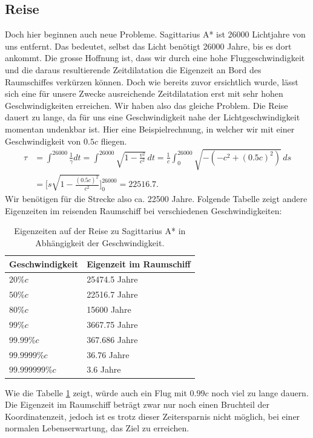 \begin{refsection}
    \subsection{Reise}
    Doch hier beginnen auch neue Probleme. Sagittarius A* ist 26000 Lichtjahre von uns entfernt. Das bedeutet, selbst das Licht benötigt 26000 Jahre, bis es dort ankommt. Die grosse Hoffnung ist, dass wir durch eine hohe Fluggeschwindigkeit und die daraus resultierende Zeitdilatation die Eigenzeit an Bord des Raumschiffes verkürzen können. 
    Doch wie bereits zuvor ersichtlich wurde, lässt sich eine für unsere Zwecke ausreichende Zeitdilatation erst mit sehr hohen Geschwindigkeiten erreichen. Wir haben also das gleiche Problem. Die Reise dauert zu lange, da für uns eine Geschwindigkeit nahe der Lichtgeschwindigkeit momentan undenkbar ist.
    Hier eine Beispielrechnung, in welcher wir mit einer Geschwindigkeit von $0.5c$ fliegen.
	\begin{align*}
	\tau
	&= 
	\int_{}^{26000}\frac{1}{\gamma}dt=\int_{}^{26000}\sqrt{1-\frac{v^2}{c^2}}\,dt
	= 
	\frac{1}{c}\int_{0}^{26000}\sqrt{-(-c^2+(0.5c)^2)}\,ds\\
	&=
	\biggl[s\sqrt{1-\frac{(0.5c)^{2}}{c^2}}\biggr]_0^{26000}
	=
	22516.7.
	\end{align*}
	Wir benötigen für die Strecke also ca. 22500 Jahre.
	Folgende Tabelle zeigt andere Eigenzeiten im reisenden Raumschiff bei verschiedenen Geschwindigkeiten:
    \begin{table}[H]
         \begin{center}
            \begin{tabular}{ | l | l |}
            \hline
            Geschwindigkeit & Eigenzeit im Raumschiff \\ \hline
            $20\%c$ & 25474.5 Jahre \\ 
            $50\%c$ & 22516.7 Jahre \\
            $80\%c$ & 15600 Jahre \\ 
            $99\%c$ & 3667.75 Jahre \\ 
            $99.99\%c$ & 367.686 Jahre \\ 
            $99.9999\%c$ & 36.76 Jahre \\ 
            $99.999999\%c$ & 3.6 Jahre \\ \hline
             \end{tabular}
        \end{center}
    \caption{Eigenzeiten auf der Reise zu Sagittarius A* in Abhängigkeit der Geschwindigkeit.}
    \label{table:eigenzeiten}
    \end{table}
    \noindent
	Wie die Tabelle \ref{table:eigenzeiten} zeigt, würde auch ein Flug mit $0.99c$ noch viel zu lange dauern. 
	Die Eigenzeit im Raumschiff beträgt zwar nur noch einen Bruchteil der Koordinatenzeit, jedoch ist es trotz dieser Zeitersparnis nicht möglich, bei einer normalen Lebenserwartung, das Ziel zu erreichen.
    

\end{refsection}
